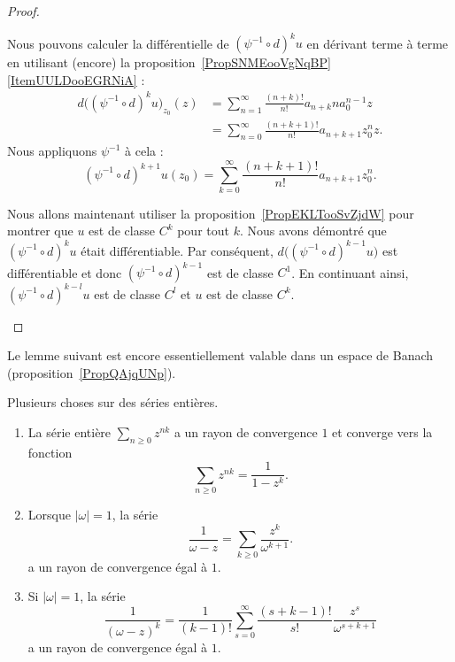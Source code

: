 \begin{proof}
\begin{subproof}
		Nous pouvons calculer la différentielle de \( (\psi^{-1}\circ d)^ku\) en dérivant terme à terme en utilisant (encore) la proposition~\ref{PropSNMEooVgNqBP}\ref{ItemUULDooEGRNiA} :
		\begin{subequations}
			\begin{align}
				d\big( (\psi^{-1}\circ d)^k u\big)_{z_0}(z) & =\sum_{n=1}^{\infty}\frac{ (n+k)! }{ n! }a_{n+k}na_{0}^{n-1}z \\
				                                            & =\sum_{n=0}^{\infty}\frac{ (n+k+1)! }{ n! }a_{n+k+1}z_{0}^nz.
			\end{align}
		\end{subequations}
		Nous appliquons \( \psi^{-1}\) à cela :
		\begin{equation}
			(\psi^{-1}\circ d)^{k+1}u(z_0)=\sum_{k=0}^{\infty}\frac{ (n+k+1)! }{ n! }a_{n+k+1}z_0^n.
		\end{equation}


		Nous allons maintenant utiliser la proposition~\ref{PropEKLTooSvZjdW} pour montrer que \( u\) est de classe \( C^k\) pour tout \( k\). Nous avons démontré que \( (\psi^{-1}\circ d)^ku\) était différentiable. Par conséquent, \( d\big( (\psi^{-1}\circ d)^{k-1}u \big)\) est différentiable et donc \( (\psi^{-1}\circ d)^{k-1}\) est de classe \( C^1\). En continuant ainsi, \( (\psi^{-1}\circ d)^{k-l}u\) est de classe \( C^l\) et \( u\) est de classe \( C^k\).
	\end{subproof}
\end{proof}

Le lemme suivant est encore essentiellement valable dans un espace de Banach (proposition~\ref{PropQAjqUNp}).
\begin{lemma}       \label{LemPQFDooGUPBvF}
	Plusieurs choses sur des séries entières.
	\begin{enumerate}
		\item
		      La série entière \( \sum_{n\geq 0}z^{nk}\) a un rayon de convergence \( 1\) et converge vers la fonction
		      \begin{equation}
			      \sum_{n\geq 0}z^{nk}=\frac{1}{ 1-z^k }.
		      \end{equation}
		\item
		      Lorsque \( | \omega |=1\), la série
		      \begin{equation}        \label{EqSSHZooLwCBAZ}
			      \frac{1}{ \omega-z }=\sum_{k\geq 0}\frac{ z^k }{ \omega^{k+1} }.
		      \end{equation}
		      a un rayon de convergence égal à \( 1\).
		\item   \label{ITEMooHFVHooPCgzZV}
		      Si \( | \omega |=1\), la série
		      \begin{equation}
			      \frac{1}{ (\omega-z)^k }=\frac{1}{ (k-1)! }\sum_{s=0}^{\infty}\frac{ (s+k-1)! }{ s! }\frac{ z^s }{ \omega^{s+k+1} }
		      \end{equation}
		      a un rayon de convergence égal à \( 1\).
	\end{enumerate}
\end{lemma}

